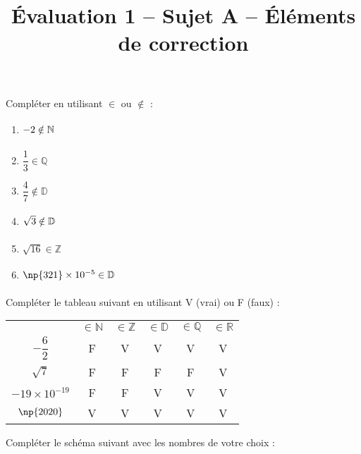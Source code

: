 \documentclass[a4paper,dvipsnames]{article}
\begin{document}
\title{Évaluation 1 -- Sujet A -- Éléments de correction}

\maketitle{}

\pagestyle{empty}

\setcounter{exercice}{1}

\exo[3 points]
Compléter en utilisant $\in$ ou $\notin$ :
\begin{multicols}{3}
  \begin{enumerate}
    \item $-2\notin\mathbb{N}\vphantom{\dfrac{1}{3}}$
    \item $\dfrac{1}{3}\in\mathbb{Q}$
    \item $\dfrac{4}{7}\notin\mathbb{D}$
    \item $\sqrt{3}\notin\mathbb{D}\vphantom{\dfrac{1}{3}}$
    \item $\sqrt{16}\in\mathbb{Z}$
    \item $\np{321}\times10^{-5}\in\mathbb{D}\vphantom{\dfrac{1}{3}}$
  \end{enumerate}
\end{multicols}

\bigskip

\exo[2 points]
Compléter le tableau suivant en utilisant V (vrai) ou F (faux) :
\begin{center}
  \begin{tabular}{@{}cccccc@{}}
    \toprule
    & $\in\mathbb{N}$ & $\in\mathbb{Z}$ & $\in\mathbb{D}$ & $\in\mathbb{Q}$ & $\in\mathbb{R}$\\
    \cmidrule(lr){2-6}
    $-\dfrac{6}{2}$ & F & V & V & V & V\\
    \addlinespace[2mm]
    $\sqrt{7}$ & F & F & F & F & V\\
    \addlinespace[1mm]
    $-19\times10^{-19}$ & F & F & V & V & V\\
    \addlinespace[1mm]
    $\np{2020}$ & V & V & V & V & V\\
    \bottomrule
  \end{tabular}
\end{center}

\bigskip

\exo[2 points] Compléter le schéma suivant avec les nombres de votre choix :
\end{document}
